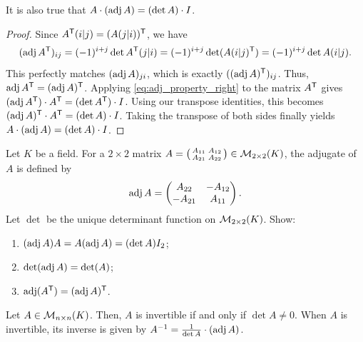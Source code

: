 \begin{lemma*}\label{lem:adj_property_left}
  It is also true that $A \cdot (\operatorname{adj} A) = (\det A) \cdot I$.
\end{lemma*}

\begin{proof}
  Since $A^{\mathsf{T}}(i|j) = (A(j|i))^{\mathsf{T}}$, we have
  \[(\operatorname{adj} A^{\mathsf{T}})_{ij} = (-1)^{i+j} \det A^{\mathsf{T}}(j|i) = (-1)^{i+j} \det(A(i|j)^{\mathsf{T}}) = (-1)^{i+j} \det A(i|j).\]
  This perfectly matches $(\operatorname{adj} A)_{ji}$, which is exactly $((\operatorname{adj} A)^{\mathsf{T}})_{ij}$. Thus, $\operatorname{adj} A^{\mathsf{T}} = (\operatorname{adj} A)^{\mathsf{T}}$.
  Applying \eqref{eq:adj_property_right} to the matrix $A^{\mathsf{T}}$ gives $(\operatorname{adj} A^{\mathsf{T}}) \cdot A^{\mathsf{T}} = (\det A^{\mathsf{T}}) \cdot I$. Using our transpose identities, this becomes $(\operatorname{adj} A)^{\mathsf{T}} \cdot A^{\mathsf{T}} = (\det A) \cdot I$. Taking the transpose of both sides finally yields $A \cdot (\operatorname{adj} A) = (\det A) \cdot I$.
\end{proof}

\begin{exercise}
  \label{exc:properties_2x2_adjugate}
  Let $K$ be a field. For a $2 \times 2$ matrix $A = \left(\begin{smallmatrix} A_{11} & A_{12} \\ A_{21} & A_{22} \end{smallmatrix}\right) \in \mathcal{M}_{2 \times 2}(K)$, the adjugate of $A$ is defined by
  \[
  \operatorname{adj} A = \begin{pmatrix} A_{22} & -A_{12} \\ -A_{21} & A_{11} \end{pmatrix}.
  \]
  Let $\det$ be the unique determinant function on $\mathcal{M}_{2 \times 2}(K)$. Show:
  \begin{enumerate}[label=\textbf{(\alph*)}]
    \item $(\operatorname{adj} A) A = A (\operatorname{adj} A) = (\det A) I_2$;
    \item $\det(\operatorname{adj} A) = \det(A)$;
    \item $\operatorname{adj}(A^{\mathsf{T}}) = (\operatorname{adj} A)^{\mathsf{T}}$.
  \end{enumerate}
\end{exercise}

\begin{theorem}
  \label{thm:inverse_adjoint}
  Let $A \in \mathcal{M}_{n \times n}(K)$. Then, $A$ is invertible if and only if $\det A \neq 0$. When $A$ is invertible, its inverse is given by $A^{-1} = \frac{1}{\det A} \cdot (\operatorname{adj} A)$.
\end{theorem}

